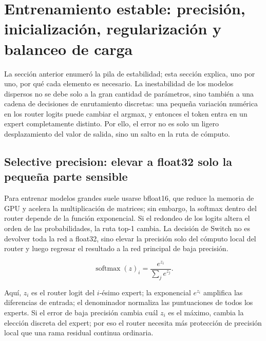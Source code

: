 \section{Entrenamiento estable: precisión, inicialización, regularización y balanceo de carga}

La sección anterior enumeró la pila de estabilidad; esta sección explica, uno por uno, por qué cada elemento es necesario. La inestabilidad de los modelos dispersos no se debe solo a la gran cantidad de parámetros, sino también a una cadena de decisiones de enrutamiento discretas: una pequeña variación numérica en los router logits puede cambiar el argmax, y entonces el token entra en un expert completamente distinto. Por ello, el error no es solo un ligero desplazamiento del valor de salida, sino un salto en la ruta de cómputo.

\subsection{Selective precision: elevar a float32 solo la pequeña parte sensible}

Para entrenar modelos grandes suele usarse bfloat16, que reduce la memoria de GPU y acelera la multiplicación de matrices; sin embargo, la softmax dentro del router depende de la función exponencial. Si el redondeo de los logits altera el orden de las probabilidades, la ruta top-1 cambia. La decisión de Switch no es devolver toda la red a float32, sino elevar la precisión solo del cómputo local del router y luego regresar el resultado a la red principal de baja precisión.


\[
\operatorname{softmax}(z)_i=\frac{e^{z_i}}{\sum_j e^{z_j}}.
\]

Aquí, $z_i$ es el router logit del $i$-ésimo expert; la exponencial $e^{z_i}$ amplifica las diferencias de entrada; el denominador normaliza las puntuaciones de todos los experts. Si el error de baja precisión cambia cuál $z_i$ es el máximo, cambia la elección discreta del expert; por eso el router necesita más protección de precisión local que una rama residual continua ordinaria.


